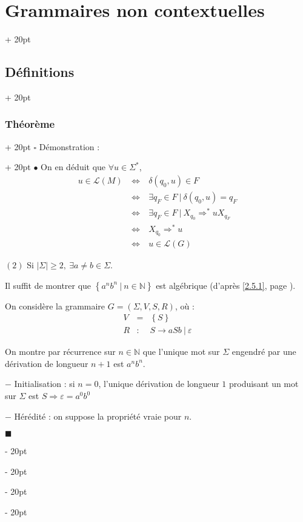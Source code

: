 \documentclass[a4paper, 12pt, twoside]{article}
\newcommand{\N}{\mathbb{N}} %
\newcommand{\lr}[1]{\left( #1 \right)}
\newcommand{\set}[1]{\left\{ #1 \right\}}
\newcommand{\abs}[1]{\left\lvert #1 \right\rvert}
\newcommand{\ssi}{\ \Leftrightarrow \ }
\renewcommand{\ge}{\geqslant}
\newcommand{\ind}[1][20pt]{\advance\leftskip + #1}
\newcommand{\deind}[1][20pt]{\advance\leftskip - #1}
\newenvironment{indt}[2][20pt]{#2 \par \ind[#1]}{\par \deind} %
\newenvironment{proof}[1][{Démonstration :}]{\begin{indt}{$\square$ #1}}{$\blacksquare$ \end{indt}}
\begin{document}
\begin{indt}{\section{Grammaires non contextuelles}}
\begin{indt}{\subsection{Définitions}}
\begin{indt}{\subsubsection{Théorème}}
\begin{proof}
                    $\bullet$ On en déduit que $\forall u \in \Sigma^*$,
                    \[
                        \begin{array}{rcl}
                            u \in \mathcal L(M)
                            &\ssi& \delta(q_0, u) \in F
                            \\
                            &\ssi& \exists q_F \in F\ |\ \delta(q_0, u) = q_F
                            \\
                            &\ssi& \exists q_F \in F\ |\ X_{q_0} \Rightarrow^* uX_{q_F}
                            \\
                            &\ssi& X_{q_0} \Rightarrow^* u
                            \\
                            &\ssi& u \in \mathcal L(G)
                        \end{array}
                    \]

                    \vspace{12pt}
                    
                    $(2)$ Si $\abs \Sigma \ge 2,\ \exists a \neq b \in \Sigma$.

                    Il suffit de montrer que $\set{a^n b^n\ |\ n \in \N}$ est algébrique (d'après \ref{2.5.1}, page \pageref{2.5.1}).

                    On considère la grammaire $G = \lr{\Sigma, V, S, R}$, où :
                    \[
                        \begin{array}{rcl}
                            V &=& \set S
                            \\
                            R &:& S \rightarrow aSb \ |\ \varepsilon
                        \end{array}
                    \]

                    On montre par récurrence sur $n \in \N$ que l'unique mot sur $\Sigma$ engendré par une dérivation de longueur $n + 1$ est $a^n b^n$.

                    \vspace{6pt}
                    
                    $-$ Initialisation : si $n = 0$, l'unique dérivation de longueur $1$ produisant un mot sur $\Sigma$ est $S \Rightarrow \varepsilon = a^0 b^0$

                    \vspace{6pt}
                    
                    $-$ Hérédité : on suppose la propriété vraie pour $n$.


\end{proof}
\end{indt}
\end{indt}
\end{indt}
\end{document}
